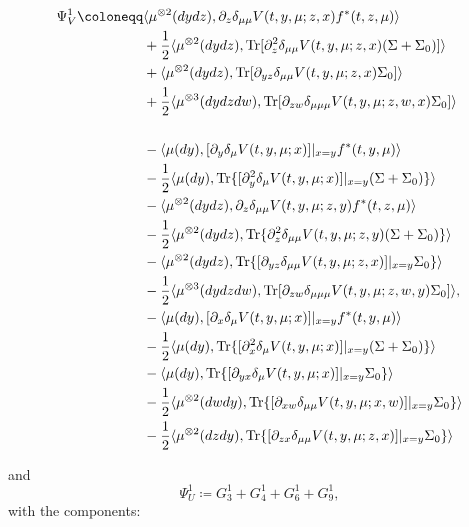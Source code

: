 \documentclass{amsart}
\theoremstyle{definition}
\theoremstyle{remark}
\def\D{\partial}
\numberwithin{equation}{section}
\begin{document}
{\allowdisplaybreaks

\begin{align*}
\Psi_V^1\coloneqq& \langle \mu^{\otimes2}(dydz), \D_z\delta_{\mu\mu} V(t,y, \mu; z,x) f^*(t, z,\mu)\rangle \notag  \\
&\hskip -0cm +\frac{1}{2}\langle  \mu^{\otimes2}(dydz), {\rm Tr}[
\D_{z}^2 \delta_{\mu\mu}
V(t, y, \mu; z,x) (\Sigma+\Sigma_0)]\rangle \notag \\
&+ \langle \mu^{\otimes2}(dydz), {\rm Tr} [ \D_{yz}\delta_{\mu\mu} V(t,y, \mu;z,x)  \Sigma_0]\rangle \notag  \\
&+\frac{1}{2}\langle\mu^{\otimes3}(dydzdw), {\rm Tr}[\D_{zw}\delta_{\mu\mu\mu} V (t, y, \mu; z,w,x)
\Sigma_0]\rangle \notag\\
&\\
 &-\langle\mu(dy),  [\D_{y} \delta_\mu V (t, y, \mu;x)]|_{x=y}
f^*(t,y,  \mu) \rangle
 \notag \\
&- \frac{1}{2} \langle \mu(dy),  {\rm Tr}
\{[\D_{y}^2\delta_\mu V(t, y, \mu;x)]|_{x=y}(\Sigma+ \Sigma_0  ) \}\rangle \\
& -\langle \mu^{\otimes2}(dydz), \D_z\delta_{\mu\mu} V(t,y, \mu; z,y) f^*(t, z,\mu)\rangle \notag  \\
&-\frac{1}{2}\langle  \mu^{\otimes2}(dydz), {\rm Tr}\{
\D_{z}^2 \delta_{\mu\mu}
V(t, y, \mu; z,y) (\Sigma+\Sigma_0)\}\rangle \notag \\
&- \langle \mu^{\otimes2}(dydz), {\rm Tr}\{ [ \D_{yz}\delta_{\mu\mu} V(t,y, \mu;z,x)]|_{x=y}  \Sigma_0 \}\rangle \notag  \\
&-\frac{1}{2}\langle\mu^{\otimes3}(dydzdw), {\rm Tr}[\D_{zw}\delta_{\mu\mu\mu} V (t, y, \mu; z,w,y)
\Sigma_0]\rangle ,\notag\\
&-\langle\mu(dy), [\D_x\delta_\mu V(t,y, \mu; x)]|_{x=y} f^*(t, y,\mu)\rangle \\
& - \frac{1}{2}\langle\mu(dy), {\rm Tr}\{[
\D_{x}^2 \delta_\mu
V(t, y, \mu; x)]|_{x=y} (\Sigma+\Sigma_0)\}\rangle \\
&-\langle\mu(dy),  {\rm Tr}\{ [ \D_{yx}\delta_\mu V(t,y, \mu;x)]|_{x=y}  \Sigma_0 \}\rangle  \\
& - \frac{1}{2}\langle\mu^{\otimes2}(dwdy), {\rm Tr}\{[\D_{xw}\delta_{\mu\mu} V (t, y, \mu; x,w)]|_{x=y}
\Sigma_0\}\rangle\\
& - \frac{1}{2}\langle\mu^{\otimes2}(dzdy), {\rm Tr}\{[\D_{zx}\delta_{\mu\mu} V (t, y, \mu; z,x)]|_{x=y}
\Sigma_0\}\rangle
\end{align*}
}
and
$$
\Psi_U^1\coloneqq G_3^1+G_4^1+G_6^1+G_9^1,
$$
with the components:
\end{document}
